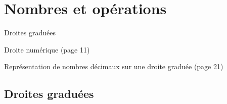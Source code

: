 \documentclass[a4paper,11pt]{report}
\begin{document}
\newcommand{\chapterName}{Nombres et opérations}
\newcommand{\serieName}{Droites graduées}


\chapter*{\chapterName}
\thispagestyle{empty}

\begin{amL}{\serieName}{
\item Droite numérique  (page 11)
\item Représentation de nombres décimaux sur une droite graduée (page 21)
}
\end{amL}
\section*{\serieName}
\setcounter{page}{1}
\thispagestyle{firstPage}



\end{document}
